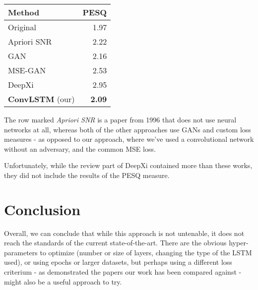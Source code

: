 \documentclass[11pt]{article}
\begin{document}
\begin{center}
\begin{tabular}{lr}
\textbf{Method} & PESQ\\
\hline
Original & 1.97\\
Apriori SNR & 2.22\\
GAN & 2.16\\
MSE-GAN & 2.53\\
DeepXi & 2.95\\
\textbf{ConvLSTM} (our) & \textbf{2.09}\\
\end{tabular}
\end{center}

The row marked \emph{Apriori SNR} \cite{543199} is a paper from 1996 that does not use
neural networks at all, whereas both of the other approaches use GANs and custom
loss measures \cite{pascual2017segan, 8462068} - as opposed to our approach,
where we've used a convolutional network without an adversary, and the common
MSE loss.

Unfortunately, while the review part of DeepXi contained more than these works,
they did not include the results of the PESQ measure.

\section{Conclusion}
\label{sec:org08881c5}
Overall, we can conclude that while this approach is not untenable, it does not
reach the standards of the current state-of-the-art. There are the obvious
hyper-parameters to optimize (number or size of layers, changing the type of the
LSTM used), or using epochs or larger datasets, but perhaps using a different
loss criterium - as demonstrated the papers our work has been compared against -
might also be a useful approach to try.




\end{document}
